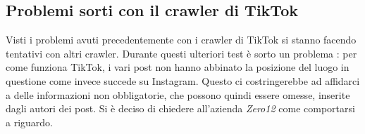 \subsection{Problemi sorti con il crawler di TikTok}
Visti i problemi avuti precedentemente con i crawler di TikTok si stanno facendo tentativi con altri crawler.
Durante questi ulteriori test è sorto un problema : per come funziona TikTok, i vari post non hanno abbinato la posizione del luogo in questione come invece succede su Instagram. Questo ci costringerebbe ad affidarci a delle informazioni non obbligatorie, che possono quindi essere omesse, inserite dagli autori dei post. Si è deciso di chiedere all'azienda \textit{Zero12} come comportarsi a riguardo.
